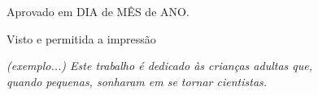 \begin{folhadeaprovacao}
  \vspace{1cm}
  \vspace*{\fill}
    \begin{flushleft}
  	  Aprovado em DIA de MÊS de ANO. \\
    \end{flushleft}
  \vspace*{\fill}
    \vspace*{\fill}
    \begin{flushleft}
    	Visto e permitida a impressão\\
        \imprimirlocal
    \end{flushleft}
    
  
\end{folhadeaprovacao}

\begin{dedicatoria}
   \vspace*{\fill}
   \centering
   \noindent
   \textit{(exemplo...) Este trabalho é dedicado às crianças adultas que,\\
   quando pequenas, sonharam em se tornar cientistas.} 
   \vspace*{\fill}
\end{dedicatoria}

